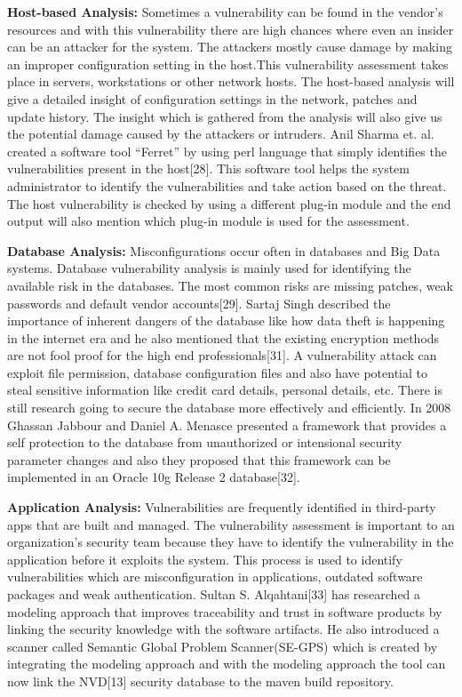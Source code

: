 {\bf Host-based Analysis:} Sometimes a vulnerability can be found in the vendor's resources and with this vulnerability there are high chances where even an insider can be an attacker for the system. The attackers mostly cause damage by making an improper configuration setting in the host.This vulnerability assessment takes place in servers, workstations or other network hosts. The host-based analysis will give a detailed insight of configuration settings in the network, patches and update history. The insight which is gathered from the analysis will also give us the potential damage caused by the attackers or intruders. Anil Sharma et. al. created a software tool “Ferret” by using perl language that simply identifies the vulnerabilities present in the host[28]. This software tool helps the system administrator to identify the vulnerabilities and take action based on the threat. The host vulnerability is checked by using a different plug-in module and the end output will also mention which plug-in module is used for the assessment.

{\bf Database Analysis:} Misconfigurations occur often in databases and Big Data systems. Database vulnerability analysis is mainly used for identifying the available risk in the databases. The most common risks are missing patches, weak passwords and default vendor accounts[29]. Sartaj Singh described the importance of inherent dangers of the database like how data theft is happening in the internet era and he also mentioned that the existing encryption methods are not fool proof for the high end professionals[31]. A vulnerability attack can exploit file permission, database configuration files and also have potential to steal sensitive information like credit card details, personal details, etc. There is still research going to secure the database more effectively and efficiently. In 2008 Ghassan Jabbour and Daniel A. Menasce presented a framework that provides a self protection to the database from unauthorized or intensional security parameter changes and also they proposed that this framework can be implemented in an Oracle 10g Release 2 database[32].

{\bf Application Analysis:} Vulnerabilities are frequently identified in third-party apps that are built and managed. The vulnerability assessment is important to an organization’s security team because they have to identify the vulnerability in the application before it exploits the system. This process is used to identify vulnerabilities which are misconfiguration in applications, outdated software packages and weak authentication. Sultan S. Alqahtani[33] has researched a modeling approach that improves traceability and trust in software products by linking the security knowledge with the software artifacts. He also introduced a scanner called  Semantic Global Problem Scanner(SE-GPS) which is created by integrating the modeling approach and with the modeling approach the tool can now link the NVD[13] security database to the maven build repository. 
